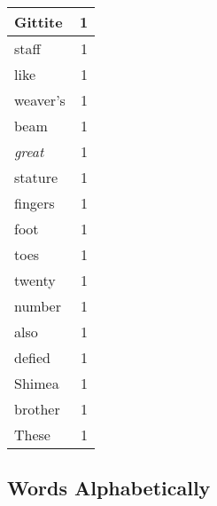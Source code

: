 \begin{center}
\begin{longtable}{l|r}
Gittite & 1 \\ \hline
staff & 1 \\ \hline
like & 1 \\ \hline
weaver's & 1 \\ \hline
beam & 1 \\ \hline
\emph{great} & 1 \\ \hline
stature & 1 \\ \hline
fingers & 1 \\ \hline
foot & 1 \\ \hline
toes & 1 \\ \hline
twenty & 1 \\ \hline
number & 1 \\ \hline
also & 1 \\ \hline
defied & 1 \\ \hline
Shimea & 1 \\ \hline
brother & 1 \\ \hline
These & 1 \\ \hline
\end{longtable}
\end{center}



\normalsize



\subsection{Words Alphabetically}

